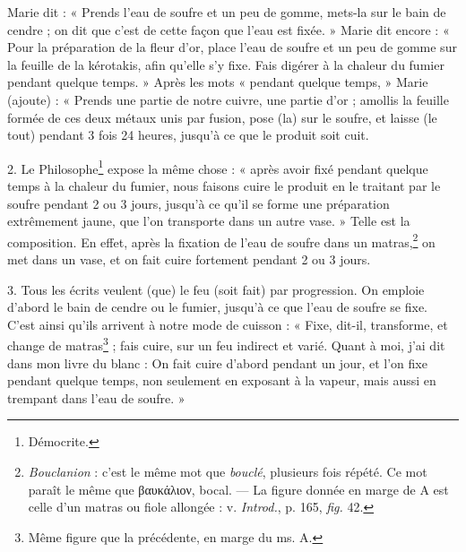 \documentclass[a4paper, 11pt, oneside, polutonikogreek, french]{article}
\begin{document}
Marie dit : « Prends l'eau de soufre et un peu de gomme, mets-la sur le bain de cendre ; on dit que c'est de cette façon que l'eau est fixée. » Marie dit encore : « Pour la préparation de la fleur d'or, place l'eau de soufre et un peu de gomme sur la feuille de la kérotakis, afin qu'elle s'y fixe. Fais digérer à la chaleur du fumier pendant quelque temps. » Après les mots « pendant quelque temps, » Marie (ajoute) : « Prends une partie de notre cuivre, une partie d'or ; amollis la feuille formée de ces deux métaux unis par fusion, pose (la) sur le soufre, et laisse (le tout) pendant 3 fois 24 heures, jusqu'à ce que le produit soit cuit.

2. Le Philosophe\footnote{Démocrite.} expose la même chose : « après avoir fixé pendant quelque temps à la chaleur du fumier, nous faisons cuire le produit en le traitant par le soufre pendant 2 ou 3 jours, jusqu'à ce qu'il se forme une préparation extrêmement jaune, que l'on transporte dans un autre vase. » Telle est la composition. En effet, après la fixation de l'eau de soufre dans un matras,\footnote{\emph{Bouclanion} : c'est le même mot que \emph{bouclé}, plusieurs fois répété. Ce mot paraît le même que βαυκάλιον, bocal. --- La figure donnée en marge de A est celle d'un matras ou fiole allongée : v. \emph{Introd.}, p. 165, \emph{fig.} 42.} on met dans un vase, et on fait cuire fortement pendant 2 ou 3 jours.

3. Tous les écrits veulent (que) le feu (soit fait) par progression. On emploie d'abord le bain de cendre ou le fumier, jusqu'à ce que l'eau de soufre se fixe. C'est ainsi qu'ils arrivent à notre mode de cuisson : « Fixe, dit-il, transforme, et change de matras\footnote{Même figure que la précédente, en marge du ms. A.} ; fais cuire, sur un feu indirect et varié. Quant à moi, j'ai dit dans mon livre du blanc : On fait cuire d'abord pendant un jour, et l'on fixe pendant quelque temps, non seulement en exposant à la vapeur, mais aussi en trempant dans l'eau de soufre. »
\end{document}
